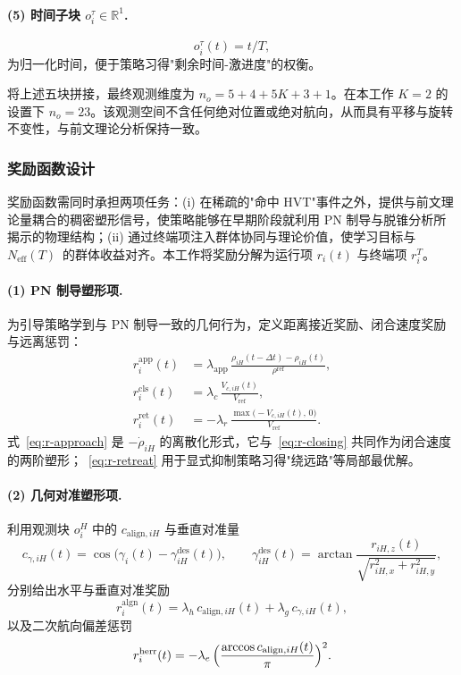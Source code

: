\paragraph{(5) 时间子块 $o_i^{\tau}\in\mathbb{R}^{1}$.}
\begin{equation}
o_i^{\tau}(t)=t/T,
\end{equation}
为归一化时间，便于策略习得"剩余时间-激进度"的权衡。

将上述五块拼接，最终观测维度为 $n_o=5+4+5K+3+1$。在本工作 $K=2$ 的设置下 $n_o=23$。该观测空间不含任何绝对位置或绝对航向，从而具有平移与旋转不变性，与前文理论分析保持一致。

\subsubsection{奖励函数设计}
\label{subsec:rl-reward}

奖励函数需同时承担两项任务：(i) 在稀疏的"命中 HVT"事件之外，提供与前文理论量耦合的稠密塑形信号，使策略能够在早期阶段就利用 PN 制导与脱锥分析所揭示的物理结构；(ii) 通过终端项注入群体协同与理论价值，使学习目标与~$N_{\mathrm{eff}}(T)$~的群体收益对齐。本工作将奖励分解为运行项 $r_i(t)$ 与终端项 $r_i^{T}$。

\paragraph{(1) PN 制导塑形项.}
为引导策略学到与 PN 制导一致的几何行为，定义距离接近奖励、闭合速度奖励与远离惩罚：
\begin{align}
r_i^{\mathrm{app}}(t)&=\lambda_{\mathrm{app}}\,\frac{\rho_{iH}(t-\Delta t)-\rho_{iH}(t)}{\rho^{\mathrm{ref}}},
\label{eq:r-approach}\\
r_i^{\mathrm{cls}}(t)&=\lambda_{c}\,\frac{V_{c,iH}(t)}{V_{\mathrm{ref}}},
\label{eq:r-closing}\\
r_i^{\mathrm{ret}}(t)&=-\lambda_r\,\frac{\max\bigl(-V_{c,iH}(t),\,0\bigr)}{V_{\mathrm{ref}}}.
\label{eq:r-retreat}
\end{align}
式~\eqref{eq:r-approach} 是 $-\dot\rho_{iH}$ 的离散化形式，它与~\eqref{eq:r-closing} 共同作为闭合速度的两阶塑形；~\eqref{eq:r-retreat} 用于显式抑制策略习得"绕远路"等局部最优解。

\paragraph{(2) 几何对准塑形项.}
利用观测块 $o_i^{H}$ 中的 $c_{\mathrm{align},iH}$ 与垂直对准量
\begin{equation}
c_{\gamma,iH}(t)=\cos\!\bigl(\gamma_i(t)-\gamma_{iH}^{\mathrm{des}}(t)\bigr),\qquad
\gamma_{iH}^{\mathrm{des}}(t)=\arctan\!\frac{r_{iH,z}(t)}{\sqrt{r_{iH,x}^{2}+r_{iH,y}^{2}}},
\end{equation}
分别给出水平与垂直对准奖励
\begin{equation}
r_i^{\mathrm{algn}}(t)=\lambda_h\,c_{\mathrm{align},iH}(t)+\lambda_g\,c_{\gamma,iH}(t),
\label{eq:r-align}
\end{equation}
以及二次航向偏差惩罚
\begin{equation}
r_i^{\mathrm{herr}}(t)=-\lambda_e\,\Bigl(\dfrac{\arccos c_{\mathrm{align},iH}(t)}{\pi}\Bigr)^{2}.
\label{eq:r-herr}
\end{equation}

